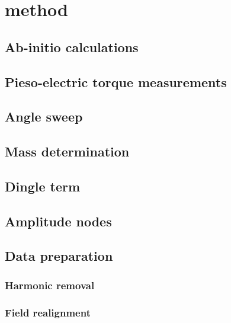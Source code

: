 
\section{method}

    \subsection{Ab-initio calculations}

    \subsection{Pieso-electric torque measurements}

    \subsection{Angle sweep}

    \subsection{Mass determination}

    \subsection{Dingle term}

    \subsection{Amplitude nodes}

    \subsection{Data preparation}

        \subsubsection{Harmonic removal}

        \subsubsection{Field realignment}


